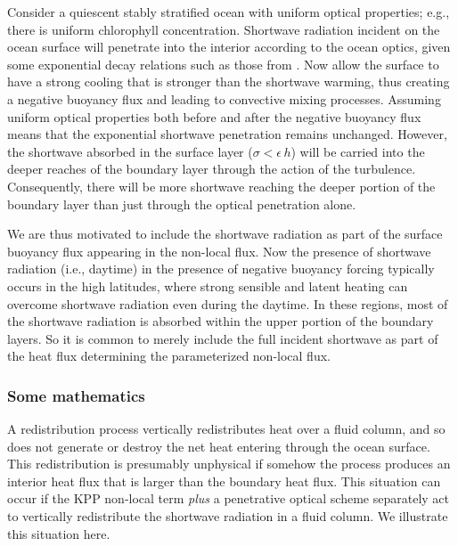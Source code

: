 Consider a quiescent stably stratified ocean with uniform optical
properties; e.g., there is uniform chlorophyll concentration.
Shortwave radiation incident on the ocean surface will penetrate into
the interior according to the ocean optics, given some exponential
decay relations such as those from \cite{Manizza_etal2005}.  Now allow
the surface to have a strong cooling that is stronger than the
shortwave warming, thus creating a negative buoyancy flux and leading
to convective mixing processes.  Assuming uniform optical properties
both before and after the negative buoyancy flux means that the
exponential shortwave penetration remains unchanged.  However, the
shortwave absorbed in the surface layer ($\sigma < \epsilon \, h$)
will be carried into the deeper reaches of the boundary layer through
the action of the turbulence.  Consequently, there will be more
shortwave reaching the deeper portion of the boundary layer than just
through the optical penetration alone.  

We are thus motivated to include the shortwave radiation as part of
the surface buoyancy flux appearing in the non-local flux.  Now the
presence of shortwave radiation (i.e., daytime) in the presence of
negative buoyancy forcing typically occurs in the high latitudes,
where strong sensible and latent heating can overcome shortwave
radiation even during the daytime.  In these regions, most of the
shortwave radiation is absorbed within the upper portion of the
boundary layers.  So it is common to merely include the full incident
shortwave as part of the heat flux determining the parameterized
non-local flux.


\subsubsection{Some mathematics}

A redistribution process vertically redistributes heat over a fluid
column, and so does not generate or destroy the net heat entering
through the ocean surface.  This redistribution is presumably
unphysical if somehow the process produces an interior heat flux that
is larger than the boundary heat flux.  This situation can occur if
the KPP non-local term {\it plus} a penetrative optical scheme
separately act to vertically redistribute the shortwave radiation in a
fluid column.  We illustrate this situation here. 

